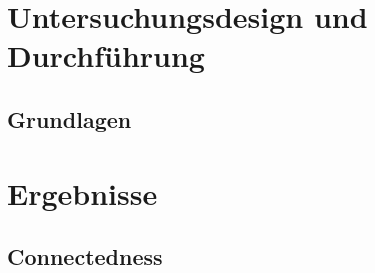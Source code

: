
\section{Untersuchungsdesign und Durchführung} %
\label{sec:m_untersuchungsdesign}



\subsection{Grundlagen} %
\label{sub:m_untersuchungsdesign_grundlagen}





\section{Ergebnisse} %
\label{sec:m_ergebnisse}


\subsection{Connectedness} %
\label{sub:connectedness}


